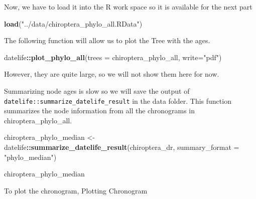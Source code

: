 \documentclass[]{article}
\newenvironment{Shaded}{\begin{snugshade}}{\end{snugshade}}
\newcommand{\CommentTok}[1]{\textcolor[rgb]{0.56,0.35,0.01}{\textit{#1}}}
\newcommand{\DataTypeTok}[1]{\textcolor[rgb]{0.13,0.29,0.53}{#1}}
\newcommand{\DecValTok}[1]{\textcolor[rgb]{0.00,0.00,0.81}{#1}}
\newcommand{\FloatTok}[1]{\textcolor[rgb]{0.00,0.00,0.81}{#1}}
\newcommand{\KeywordTok}[1]{\textcolor[rgb]{0.13,0.29,0.53}{\textbf{#1}}}
\newcommand{\NormalTok}[1]{#1}
\newcommand{\OperatorTok}[1]{\textcolor[rgb]{0.81,0.36,0.00}{\textbf{#1}}}
\newcommand{\StringTok}[1]{\textcolor[rgb]{0.31,0.60,0.02}{#1}}
\begin{document}
Now, we have to load it into the R work space so it is available for the
next part

\begin{Shaded}
\begin{Highlighting}[]
\KeywordTok{load}\NormalTok{(}\StringTok{"../data/chiroptera_phylo_all.RData"}\NormalTok{)}
\end{Highlighting}
\end{Shaded}

The following function will allow us to plot the Tree with the ages.

\begin{Shaded}
\begin{Highlighting}[]
\NormalTok{datelife}\OperatorTok{::}\KeywordTok{plot_phylo_all}\NormalTok{(}\DataTypeTok{trees =}\NormalTok{ chiroptera_phylo_all, }\DataTypeTok{write=}\StringTok{"pdf"}\NormalTok{)}
\end{Highlighting}
\end{Shaded}

However, they are quite large, so we will not show them here for now.

Summarizing node ages is slow so we will save the output of
\texttt{datelife::summarize\_datelife\_result} in the data folder. This
function summarizes the node information from all the chronograms in
chiroptera\_phylo\_all.

\begin{Shaded}
\begin{Highlighting}[]
\NormalTok{chiroptera_phylo_median <-}\StringTok{  }\NormalTok{datelife}\OperatorTok{::}\KeywordTok{summarize_datelife_result}\NormalTok{(chiroptera_dr, }\DataTypeTok{summary_format =} \StringTok{"phylo_median"}\NormalTok{)}

\NormalTok{chiroptera_phylo_median}
\end{Highlighting}
\end{Shaded}

To plot the chronogram, Plotting Chronogram

\begin{Shaded}
\end{Shaded}
\end{document}
